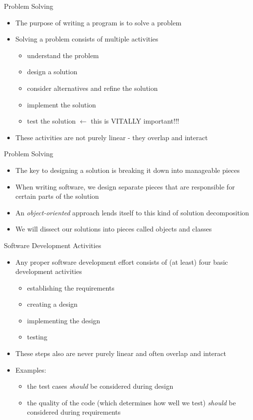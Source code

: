 \documentclass{beamer}
\begin{document}
\begin{frame}{Problem Solving}
\begin{itemize}
\item The purpose of writing a program is to solve a problem
\item Solving a problem consists of multiple activities
\begin{itemize}
\item understand the problem
\item design a solution
\item consider alternatives and refine the solution
\item implement the solution
\item test the solution $\leftarrow$ this is VITALLY important!!!
\end{itemize}
\item These activities are not purely linear - they overlap and interact
\end{itemize}
\end{frame}

\begin{frame}{Problem Solving}
\begin{itemize}
\item The key to designing a solution is breaking it down into manageable pieces
\item When writing software, we design separate pieces that are responsible for certain parts of the solution
\item An \textit{object-oriented} approach lends itself to this kind of solution decomposition
\item We will dissect our solutions into pieces called objects and classes
\end{itemize}
\end{frame}

\begin{frame}{Software Development Activities}
\begin{itemize}
\item Any proper software development effort consists of (at least) four basic development activities
\begin{itemize}
\item establishing the requirements
\item creating a design
\item implementing the design
\item testing
\end{itemize}
\item These steps also are never purely linear and often overlap and interact
\item Examples: 
\begin{itemize}
\item the test cases \textit{should} be considered during design
\item the quality of the code (which determines how well we test) \textit{should} be considered during requirements
\end{itemize}
\end{itemize}
\end{frame}
\end{document}
